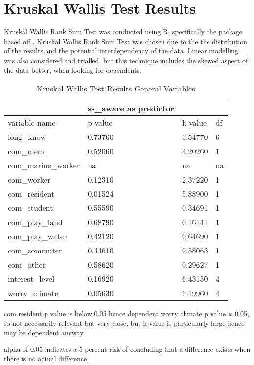 \section{Kruskal Wallis Test Results}
Kruskal Wallis Rank Sum Test was conducted using R, specifically the package based off \cite{hollander_nonparametric_2014}. Kruskal Wallis Rank Sum Test was chosen due to the the distribution of the results and the potential interdependency of the data. Linear modelling was also considered and trialled, but this technique includes the skewed aspect of the data better, when looking for dependents. 
\begin{table}[!ht]
    \centering
    \begin{tabular}{|l|l|l|l|}
    \hline
         ~ & ss\_aware as predictor & ~ & ~ \\ \hline
        variable name & p value & h value & df \\ \hline
           long\_know & 0.73760 & 3.54770 & 6 \\ \hline
        com\_mem & 0.52060 & 4.20260 & 1 \\ \hline
        com\_marine\_worker & na & na & na \\ \hline
        com\_worker & 0.12310 & 2.37220 & 1 \\ \hline
        com\_resident & 0.01524 & 5.88900 & 1 \\ \hline
        com\_student & 0.55590 & 0.34691 & 1 \\ \hline
        com\_play\_land & 0.68790 & 0.16141 & 1 \\ \hline
        com\_play\_water & 0.42120 & 0.64690 & 1 \\ \hline
        com\_commuter & 0.44610 & 0.58063 & 1 \\ \hline
        com\_other & 0.58620 & 0.29627 & 1 \\ \hline
        interest\_level & 0.16920 & 6.43150 & 4 \\ \hline
        worry\_climate & 0.05630 & 9.19960 & 4 \\ \hline
    \end{tabular}
    \caption{Kruskal Wallis Test Results General Variables}
    \label{Kruskal_wallis_test_general}
\end{table}
com resident p value is below 0.05 hence dependent
worry climate p value is 0.05, so not necessarily relevant but very close, but h-value is particularly large hence may be dependent anyway

alpha of 0.05 indicates a 5 percent
risk of concluding that a difference exists when there is no actual difference.

